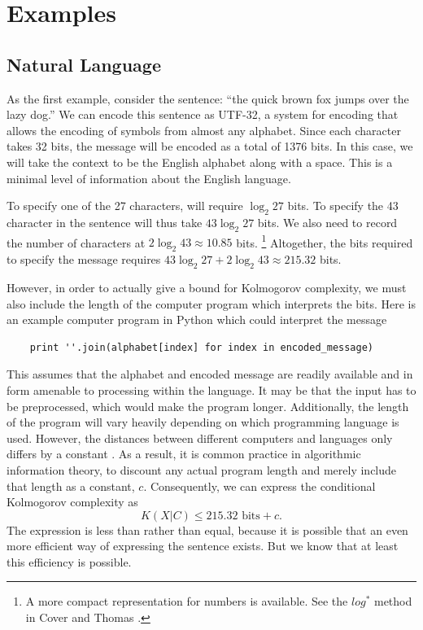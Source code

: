 \section{Examples}
\subsection{Natural Language}
As the first example, consider the sentence: ``the quick brown fox jumps over the lazy dog.''
We can encode this sentence as UTF-32, a system for encoding that allows the encoding of symbols from almost any alphabet.
Since each character takes 32 bits, the message will be encoded as a total of 1376 bits.
In this case, we will take the context to be the English alphabet along with a space.
This is a minimal level of information about the English language.

To specify one of the 27 characters, will require $\log_2 27$ bits. 
To specify the 43 character in the sentence will thus take $43 \log_2 27$ bits.
We also need to record the number of characters at $2 \log_2 43 \approx 10.85$ bits. 
\footnote{A more compact representation for numbers is available. See the $log^*$ method in Cover and Thomas \cite{Cover2006}.}
Altogether, the bits required to specify the message requires $43 \log_2 27 + 2 \log_2 43 \approx 215.32$ bits. 


However, in order to actually give a bound for Kolmogorov complexity, we must also include the length of the computer program which interprets the bits.
Here is an example computer program in Python which could interpret the message
\begin{verbatim}
    print ''.join(alphabet[index] for index in encoded_message)
\end{verbatim}
This assumes that the alphabet and encoded message are readily available and in form amenable to processing within the language.
It may be that the input has to be preprocessed, which would make the program longer.
Additionally, the length of the program will vary heavily depending on which programming language is used.
However, the distances between different computers and languages only differs by a constant \cite{Cover2006}.
As a result, it is common practice in algorithmic information theory, to discount any actual program length and merely include that length 
as a constant, $c$. 
Consequently, we can express the conditional Kolmogorov complexity as 
\begin{equation}
    \label{kc.alpha}
    K(X|C) \leq 215.32 \mbox{ bits} + c \mbox{.}
\end{equation}
The expression is less than rather than equal, because it is possible that an even more efficient way of expressing the sentence exists.
But we know that at least this efficiency is possible.

